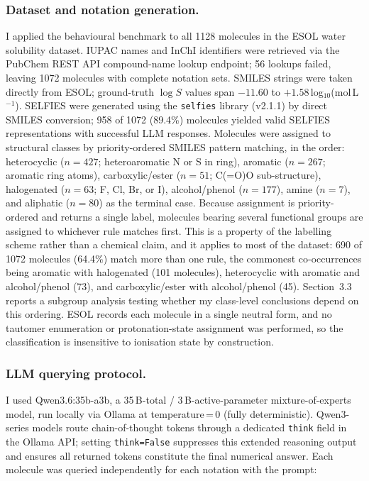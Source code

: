 \documentclass[twoside,twocolumn,9pt]{article}
\newcommand{\logS}{\ensuremath{\log S}}
\begin{document}
\subsubsection{Dataset and notation generation.~~} I applied the behavioural benchmark to all 1128 molecules in the ESOL water solubility dataset.\cite{delaney2004} IUPAC names and InChI identifiers were retrieved via the PubChem REST API compound-name lookup endpoint;\cite{kim2021} 56 lookups failed, leaving 1072 molecules with complete notation sets. SMILES strings were taken directly from ESOL; ground-truth $\logS$ values span $-11.60$ to $+1.58$\,log$_{10}$(mol\,L$^{-1}$). SELFIES were generated using the \texttt{selfies} library (v2.1.1)\cite{krenn2020} by direct SMILES conversion; 958 of 1072 (89.4\%) molecules yielded valid SELFIES representations with successful LLM responses. Molecules were assigned to structural classes by priority-ordered SMILES pattern matching, in the order: heterocyclic ($n=427$; heteroaromatic N or S in ring), aromatic ($n=267$; aromatic ring atoms), carboxylic/ester ($n=51$; C(=O)O sub-structure), halogenated ($n=63$; F, Cl, Br, or I), alcohol/phenol ($n=177$), amine ($n=7$), and aliphatic ($n=80$) as the terminal case. Because assignment is priority-ordered and returns a single label, molecules bearing several functional groups are assigned to whichever rule matches first. This is a property of the labelling scheme rather than a chemical claim, and it applies to most of the dataset: 690 of 1072 molecules (64.4\%) match more than one rule, the commonest co-occurrences being aromatic with halogenated (101 molecules), heterocyclic with aromatic and alcohol/phenol (73), and carboxylic/ester with alcohol/phenol (45). Section~3.3 reports a subgroup analysis testing whether my class-level conclusions depend on this ordering. ESOL records each molecule in a single neutral form, and no tautomer enumeration or protonation-state assignment was performed, so the classification is insensitive to ionisation state by construction.

\subsubsection{LLM querying protocol.~~} I used Qwen3.6:35b-a3b,\cite{qwen2025} a 35\,B-total / 3\,B-active-parameter mixture-of-experts model, run locally via Ollama at temperature\,=\,0 (fully deterministic). Qwen3-series models route chain-of-thought tokens through a dedicated \texttt{think} field in the Ollama API; setting \texttt{think=False} suppresses this extended reasoning output and ensures all returned tokens constitute the final numerical answer. Each molecule was queried independently for each notation with the prompt:
\end{document}
